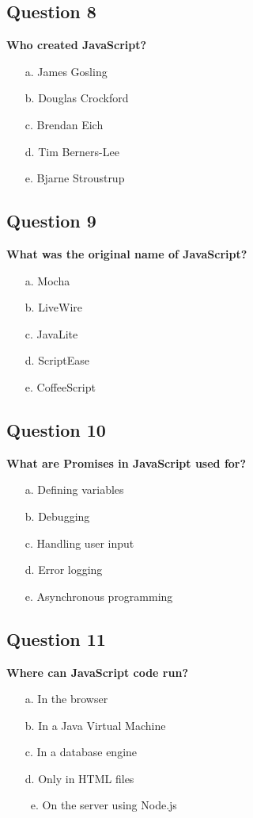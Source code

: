 \documentclass{article}
\newcommand{\cmark}{\textcolor{green}{\ding{51}}} %
\begin{document}
\subsection*{Question 8}
\textbf{Who created JavaScript?}

\begin{itemize}
  \item[a.] James Gosling
  \item[b.] Douglas Crockford
  \item[c.] Brendan Eich
  \item[d.] Tim Berners-Lee
  \item[e.] Bjarne Stroustrup
\end{itemize}

\subsection*{Question 9}
\textbf{What was the original name of JavaScript?}

\begin{itemize}
  \item[a.] Mocha
  \item[b.] LiveWire
  \item[c.] JavaLite
  \item[d.] ScriptEase
  \item[e.] CoffeeScript
\end{itemize}

\subsection*{Question 10}
\textbf{What are Promises in JavaScript used for?}

\begin{itemize}
  \item[a.] Defining variables
  \item[b.] Debugging
  \item[c.] Handling user input
  \item[d.] Error logging
  \item[e.] Asynchronous programming
\end{itemize}

\subsection*{Question 11}
\textbf{Where can JavaScript code run?}

\begin{itemize}
  \item[a.] In the browser
  \item[b.] In a Java Virtual Machine
  \item[c.] In a database engine
  \item[d.] Only in HTML files
  \item[\cmark\ e.] On the server using Node.js
\end{itemize}
\end{document}
